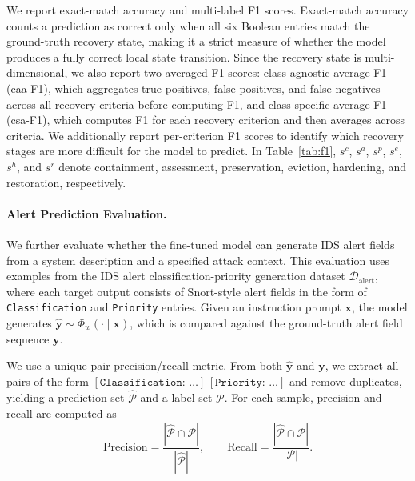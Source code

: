\documentclass[sigconf]{acmart}
\begin{document}
We report exact-match accuracy and multi-label F1 scores. Exact-match accuracy counts a prediction as correct only when all six Boolean entries match the ground-truth recovery state, making it a strict measure of whether the model produces a fully correct local state transition. Since the recovery state is multi-dimensional, we also report two averaged F1 scores: class-agnostic average
F1 (caa-F1), which aggregates true positives, false positives, and false negatives across all recovery criteria before computing F1, and class-specific
average F1 (csa-F1), which computes F1 for each recovery criterion and then averages across criteria. We additionally report per-criterion F1 scores to
identify which recovery stages are more difficult for the model to predict. In Table~\ref{tab:f1}, $s^c$, $s^a$, $s^p$, $s^e$, $s^h$, and $s^r$ denote containment, assessment, preservation, eviction, hardening, and restoration, respectively.

\begin{table}[t]
      \caption{Recovery-state prediction F1 scores.}
      \label{tab:f1}
  \end{table}

\paragraph{Alert Prediction Evaluation.}
We further evaluate whether the fine-tuned model can generate IDS alert fields from a system description and a specified attack context. This evaluation uses examples from the IDS alert classification-priority generation dataset
$\mathcal{D}_{\mathrm{alert}}$, where each target output consists of Snort-style alert fields in the form of \texttt{Classification} and \texttt{Priority} entries. Given an instruction prompt $\mathbf{x}$, the model generates $\hat{\mathbf y}\sim\Phi_w(\cdot\mid\mathbf{x})$, which is compared against the ground-truth alert field sequence $\mathbf y$.

We use a unique-pair precision/recall metric. From both $\hat{\mathbf y}$ and $\mathbf y$, we extract all pairs of the form
\([\texttt{Classification: }\ldots]\,[\texttt{Priority: }\ldots]\) and remove duplicates, yielding a prediction set $\widehat{\mathcal P}$ and a label set $\mathcal P$. For each sample, precision and recall are computed as
\begin{equation*}
    \mathrm{Precision}
    =
    \frac{|\widehat{\mathcal P}\cap\mathcal P|}
    {|\widehat{\mathcal P}|},
    \qquad
    \mathrm{Recall}
    =
    \frac{|\widehat{\mathcal P}\cap\mathcal P|}
    {|\mathcal P|}.
\end{equation*}
\end{document}
